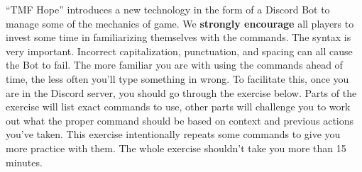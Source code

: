 \documentclass[green]{TMFHope}
\begin{document}
\name{\gDiscord{}}

``TMF Hope'' introduces a new technology in the form of a Discord Bot to manage some of the mechanics of game. We \textbf{strongly encourage} all players to invest some time in familiarizing themselves with the commands. The syntax is very important. Incorrect capitalization, punctuation, and spacing can all cause the Bot to fail. The more familiar you are with using the commands ahead of time, the less often you'll type something in wrong. To facilitate this, once you are in the Discord server, you should go through the exercise below. Parts of the exercise will list exact commands to use, other parts will challenge you to work out what the proper command should be based on context and previous actions you've taken. This exercise intentionally repeats some commands to give you more practice with them. The whole exercise shouldn't take you more than 15 minutes.
\end{document}
